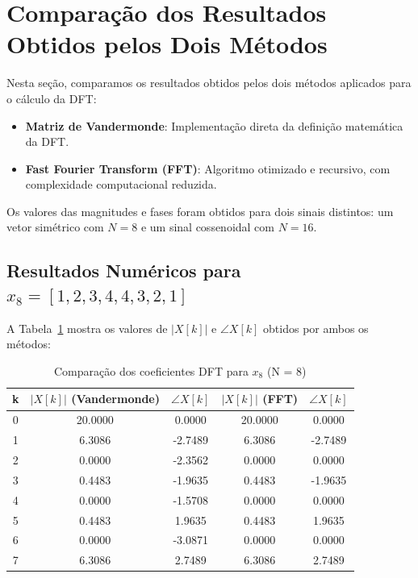 \documentclass[12pt]{article}
\begin{document}
\newpage
\section{Comparação dos Resultados Obtidos pelos Dois Métodos}

Nesta seção, comparamos os resultados obtidos pelos dois métodos aplicados para o cálculo da DFT:

\begin{itemize}
    \item \textbf{Matriz de Vandermonde}: Implementação direta da definição matemática da DFT.
    \item \textbf{Fast Fourier Transform (FFT)}: Algoritmo otimizado e recursivo, com complexidade computacional reduzida.
\end{itemize}

Os valores das magnitudes e fases foram obtidos para dois sinais distintos: um vetor simétrico com $N=8$ e um sinal cossenoidal com $N=16$.

\subsection{Resultados Numéricos para $x_8 = [1, 2, 3, 4, 4, 3, 2, 1]$}

A Tabela~\ref{tab:comp8} mostra os valores de $|X[k]|$ e $\angle X[k]$ obtidos por ambos os métodos:

\begin{table}[H]
\centering
\caption{Comparação dos coeficientes DFT para $x_8$ (N = 8)}
\label{tab:comp8}
\begin{tabular}{c|cc|cc}
\toprule
\textbf{k} & $|X[k]|$ (Vandermonde) & $\angle X[k]$ & $|X[k]|$ (FFT) & $\angle X[k]$ \\
\midrule
0 & 20.0000 & 0.0000 & 20.0000 & 0.0000 \\
1 & 6.3086 & -2.7489 & 6.3086 & -2.7489 \\
2 & 0.0000 & -2.3562 & 0.0000 & 0.0000 \\
3 & 0.4483 & -1.9635 & 0.4483 & -1.9635 \\
4 & 0.0000 & -1.5708 & 0.0000 & 0.0000 \\
5 & 0.4483 & 1.9635 & 0.4483 & 1.9635 \\
6 & 0.0000 & -3.0871 & 0.0000 & 0.0000 \\
7 & 6.3086 & 2.7489 & 6.3086 & 2.7489 \\
\bottomrule
\end{tabular}
\end{table}
\end{document}
